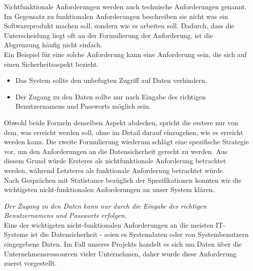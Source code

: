 \label{sec:non-functional}
Nichtfunktionale Anforderungen werden auch technische Anforderungen genannt. Im Gegensatz zu funktionalen Anforderungen beschreiben sie nicht was ein Softwareprodukt machen soll, sondern wie es arbeiten soll. Dadurch, dass die Unterscheidung liegt oft an der Formulierung der Anforderung, ist die Abgrenzung häufig nicht einfach.\\ Ein Beispiel für eine solche Anforderung kann eine Anforderung sein, die sich auf einen Sicherheitsaspekt bezieht. 

\begin{itemize}
	\item Das System sollte den unbefugten Zugriff auf Daten verhindern.
	\item Der Zugang zu den Daten sollte nur nach Eingabe des richtigen Benutzernamens und Passworts möglich sein.
\end{itemize}

Obwohl beide Formeln denselben Aspekt abdecken, spricht die erstere nur von dem, was erreicht werden soll, ohne im Detail darauf einzugehen, wie es erreicht werden kann. Die zweite Formulierung wiederum schlägt eine spezifische Strategie vor, um den Anforderungen an die Datensicherheit gerecht zu werden. Aus diesem Grund würde Ersteres als nichtfunktionale Anforderung betrachtet werden, während Letzteres als funktionale Anforderung betrachtet würde.\\
Nach Gesprächen mit Statistance bezüglich der Spezifikationen konnten wir die wichtigsten nicht-funktionalen Anforderungen an unser System klären.

\textit{Der Zugang zu den Daten kann nur durch die Eingabe des richtigen Benutzernamens und Passworts erfolgen.} \\
Eine der wichtigsten nicht-funktionalen Anforderungen an die meisten IT-Systeme ist die Datensicherheit - seien es Systemdaten oder von Systembenutzern eingegebene Daten. Im Fall unseres Projekts handelt es sich um Daten über die Unternehmensressourcen vieler Unternehmen, daher wurde diese Anforderung zuerst vorgestellt. 



